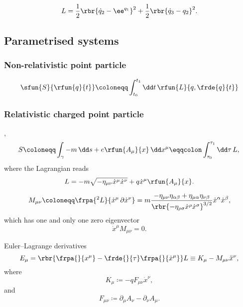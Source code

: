 \documentclass[a4paper,11pt]{article}
\begin{document}
\begin{equation}
L = \frac{1}{2} \rbr{\dot{q}_2 - \ee^{q_1}}^2 + \frac{1}{2} \rbr{\dot{q}_3 - 
q_2}^2.
\end{equation}



\subsection{Parametrised systems}

\subsubsection*{Non-relativistic point particle}

\cite[sec.\ 3.1.1]{Kiefer2012}
\begin{equation}
\sfun{S}{\rfun{q}{t}} \coloneqq \int_{t_0}^{t_1}\dd t\,\rfun{L}{q, \frde{q}{t}}
\end{equation}



\subsubsection*{Relativistic charged point particle}

\cite[sec.\ 16]{Landau1975},
\cite[sec.\ 3.1.2]{Kiefer2012}
\begin{equation}
S \coloneqq \int_\gamma -m\,\dd s + e \rfun{A_\mu}{x} \,\dd x^\mu
\eqqcolon \int_{\tau_0}^{\tau_1} \dd \tau\, L,\\
\label{eq:point-charged-action}
\end{equation}
where the Lagrangian reads
\begin{equation}
L = -m \sqrt{-\eta_{\mu\nu} \dot{x}^\mu \dot{x}^\nu } + q \dot{x}^\mu 
\rfun{A_\mu}{x}.
\end{equation}

\begin{equation}
M_{\mu\nu} \coloneqq \frpa{^2 L}{\dot{x}^\mu\,\partial \dot{x}^\nu} = 
m\frac{-\eta_{\mu\nu}\eta_{\alpha\beta} + \eta_{\mu\alpha}\eta_{\nu\beta}}%
{\rbr{-\eta_{\rho\sigma}\dot{x}^\rho \dot{x}^\sigma}^{3/2}} \dot{x}^\alpha 
\dot{x}^\beta,
\end{equation}
which has one and only one zero eigenvector
\begin{equation}
\dot{x}^\mu M_{\mu\nu} = 0.
\end{equation}

Euler--Lagrange derivatives
\begin{equation}
E_\mu = \rbr{\frpa{}{x^\mu}-\frde{}{\tau}\frpa{}{\dot{x}^\mu}} L
\equiv K_\mu - M_{\mu\nu}\ddot{x}^\nu,
\label{eq:point-charged-eld}
\end{equation}
where
\begin{equation}
K_\mu \coloneqq -q F_{\mu\nu} \dot{x}^\nu,
\end{equation}
and
\begin{equation}
F_{\mu\nu} \coloneqq \partial_\mu A_\nu - \partial_\nu A_\mu.
\end{equation}
\end{document}
